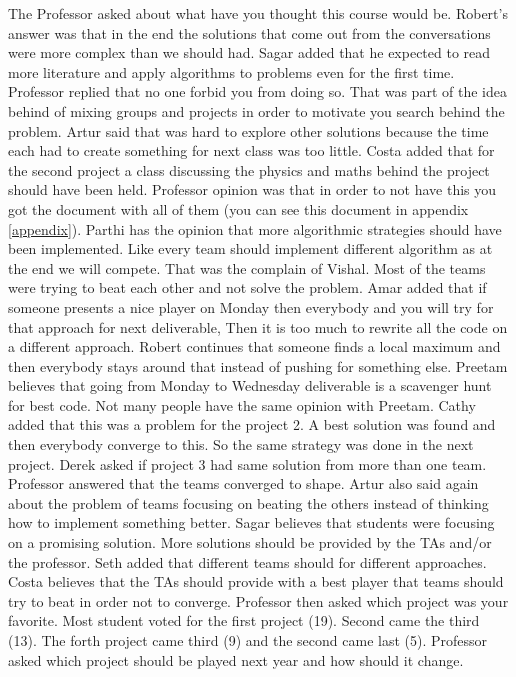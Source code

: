 The Professor asked about what have you thought this course would be. Robert's 
answer was that in the end the solutions that come out from the conversations
were more complex than we should had. Sagar added that he expected to read more
literature and apply algorithms to problems even for the first time. Professor 
replied that no one forbid you from doing so. That was part of the idea behind 
of mixing groups and projects in order to motivate you search behind the problem.
Artur said that was hard to explore other solutions because the time each had to
create something for next class was too little. Costa added that for the second
project a class discussing the physics and maths behind the project should have 
been held. Professor opinion was that in order to not have this you got the document
with all of them (you can see this document in appendix \ref{appendix}). Parthi
has the opinion that more algorithmic strategies should have been implemented. 
Like every team should implement different algorithm as at the end we will compete.
That was the complain of Vishal. Most of the teams were trying to beat each other
and not solve the problem. Amar added that if someone presents a nice player on 
Monday then everybody and you will try for that approach for next deliverable,
Then it is too much to rewrite all the code on a different approach. Robert 
continues that someone finds a local maximum and then everybody stays around that
instead of pushing for something else. Preetam believes that going from Monday
to Wednesday deliverable is a scavenger hunt for best code. Not many people have
the same opinion with Preetam. Cathy added that this was a problem for the project
2. A best solution was found and then everybody converge to this. So the same
strategy was done in the next project. Derek asked if project 3 had same solution
from more than one team. Professor answered that the teams converged to shape.
Artur also said again about the problem of teams focusing on beating the others
instead of thinking how to implement something better. Sagar believes that students
were focusing on a promising solution. More solutions should be provided by the
TAs and/or the professor. Seth added that different teams should for different 
approaches. Costa believes that the TAs should provide with a best player that
teams should try to beat in order not to converge. Professor then asked which 
project was your favorite. Most student voted for the first project (19). Second
came the third (13). The forth project came third (9) and the second came last (5).
Professor asked which project should be played next year and how should it change.

